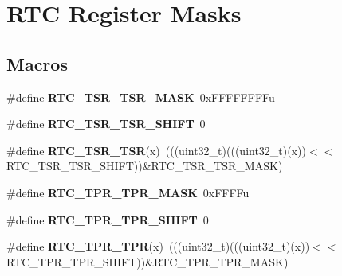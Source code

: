 \hypertarget{group__RTC__Register__Masks}{}\section{R\+TC Register Masks}
\label{group__RTC__Register__Masks}
\subsection*{Macros}
\begin{DoxyCompactItemize}
\item 
\#define {\bfseries R\+T\+C\+\_\+\+T\+S\+R\+\_\+\+T\+S\+R\+\_\+\+M\+A\+SK}~0x\+F\+F\+F\+F\+F\+F\+F\+Fu\hypertarget{group__RTC__Register__Masks_ga9a0f8842e8262ca176fcf028982153af}{}\label{group__RTC__Register__Masks_ga9a0f8842e8262ca176fcf028982153af}

\item 
\#define {\bfseries R\+T\+C\+\_\+\+T\+S\+R\+\_\+\+T\+S\+R\+\_\+\+S\+H\+I\+FT}~0\hypertarget{group__RTC__Register__Masks_gad0476d1e39a866b5b5ba4728b55e258a}{}\label{group__RTC__Register__Masks_gad0476d1e39a866b5b5ba4728b55e258a}

\item 
\#define {\bfseries R\+T\+C\+\_\+\+T\+S\+R\+\_\+\+T\+SR}(x)~(((uint32\+\_\+t)(((uint32\+\_\+t)(x))$<$$<$R\+T\+C\+\_\+\+T\+S\+R\+\_\+\+T\+S\+R\+\_\+\+S\+H\+I\+FT))\&R\+T\+C\+\_\+\+T\+S\+R\+\_\+\+T\+S\+R\+\_\+\+M\+A\+SK)\hypertarget{group__RTC__Register__Masks_ga0265b25e77883b6b0cb056ab697b5bc6}{}\label{group__RTC__Register__Masks_ga0265b25e77883b6b0cb056ab697b5bc6}

\item 
\#define {\bfseries R\+T\+C\+\_\+\+T\+P\+R\+\_\+\+T\+P\+R\+\_\+\+M\+A\+SK}~0x\+F\+F\+F\+Fu\hypertarget{group__RTC__Register__Masks_ga2682f687fa561be2f002fc574d48cc79}{}\label{group__RTC__Register__Masks_ga2682f687fa561be2f002fc574d48cc79}

\item 
\#define {\bfseries R\+T\+C\+\_\+\+T\+P\+R\+\_\+\+T\+P\+R\+\_\+\+S\+H\+I\+FT}~0\hypertarget{group__RTC__Register__Masks_ga624a290f73478b3ca2687ac49cc78fb2}{}\label{group__RTC__Register__Masks_ga624a290f73478b3ca2687ac49cc78fb2}

\item 
\#define {\bfseries R\+T\+C\+\_\+\+T\+P\+R\+\_\+\+T\+PR}(x)~(((uint32\+\_\+t)(((uint32\+\_\+t)(x))$<$$<$R\+T\+C\+\_\+\+T\+P\+R\+\_\+\+T\+P\+R\+\_\+\+S\+H\+I\+FT))\&R\+T\+C\+\_\+\+T\+P\+R\+\_\+\+T\+P\+R\+\_\+\+M\+A\+SK)\hypertarget{group__RTC__Register__Masks_gac2c160abce9b85ad4d9386f0dd8c31ea}{}\label{group__RTC__Register__Masks_gac2c160abce9b85ad4d9386f0dd8c31ea}


\end{DoxyCompactItemize}
